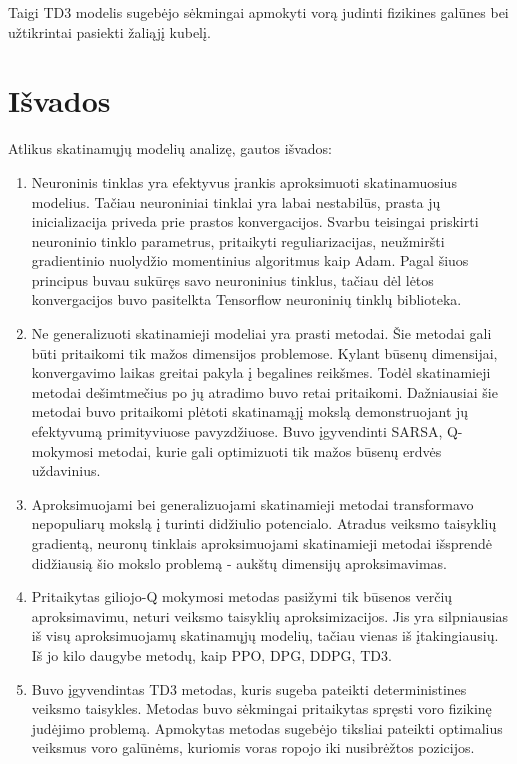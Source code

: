 \documentclass[a4paper, 12pt]{article}
\begin{document}
Taigi TD3 modelis sugebėjo sėkmingai apmokyti vorą judinti fizikines galūnes bei užtikrintai pasiekti žaliąjį kubelį.

\newpage
\section{Išvados}

Atlikus skatinamųjų modelių analizę, gautos išvados:

\begin{enumerate}
  \addtolength{\itemsep}{-0.5\baselineskip} 
  \item Neuroninis tinklas yra efektyvus įrankis aproksimuoti skatinamuosius modelius. Tačiau neuroniniai tinklai yra labai nestabilūs, prasta jų inicializacija priveda prie prastos konvergacijos. Svarbu teisingai priskirti neuroninio tinklo parametrus, pritaikyti reguliarizacijas, neužmiršti gradientinio nuolydžio momentinius algoritmus kaip Adam. Pagal šiuos principus buvau sukūręs savo neuroninius tinklus, tačiau dėl lėtos konvergacijos buvo pasitelkta Tensorflow neuroninių tinklų biblioteka.
  \item Ne generalizuoti skatinamieji modeliai yra prasti metodai. Šie metodai gali būti pritaikomi tik mažos dimensijos problemose. Kylant būsenų dimensijai, konvergavimo laikas greitai pakyla į begalines reikšmes. Todėl skatinamieji metodai dešimtmečius po jų atradimo buvo retai pritaikomi. Dažniausiai šie metodai buvo pritaikomi plėtoti skatinamąjį mokslą demonstruojant jų efektyvumą primityviuose pavyzdžiuose. Buvo įgyvendinti SARSA, Q-mokymosi metodai, kurie gali optimizuoti tik mažos būsenų erdvės uždavinius.
  \item Aproksimuojami bei generalizuojami skatinamieji metodai transformavo nepopuliarų mokslą į turinti didžiulio potencialo. Atradus veiksmo taisyklių gradientą, neuronų tinklais aproksimuojami skatinamieji metodai išsprendė didžiausią šio mokslo problemą - aukštų dimensijų aproksimavimas. 
  \item Pritaikytas giliojo-Q mokymosi metodas pasižymi tik būsenos verčių aproksimavimu, neturi veiksmo taisyklių aproksimizacijos. Jis yra silpniausias iš visų aproksimuojamų skatinamųjų modelių, tačiau vienas iš įtakingiausių. Iš jo kilo daugybe metodų, kaip PPO, DPG, DDPG, TD3.
  \item Buvo įgyvendintas TD3 metodas, kuris sugeba pateikti deterministines veiksmo taisykles. Metodas buvo sėkmingai pritaikytas spręsti voro fizikinę judėjimo problemą. Apmokytas metodas sugebėjo tiksliai pateikti optimalius veiksmus voro galūnėms, kuriomis voras ropojo iki nusibrėžtos pozicijos.
\end{enumerate}
\end{document}
